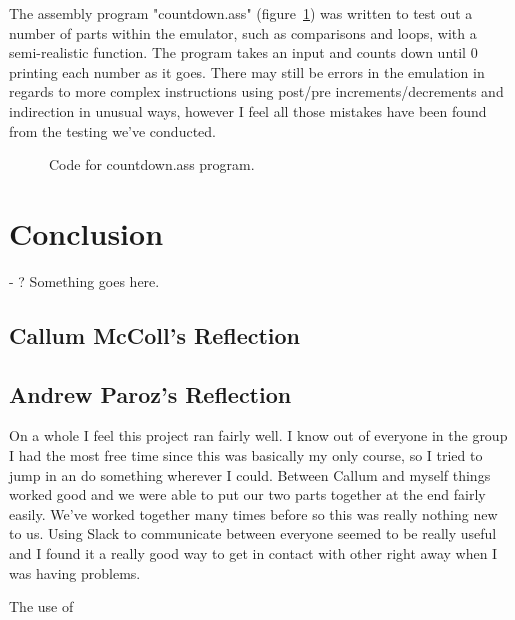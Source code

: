 \documentclass[10point]{article}
\begin{document}
The assembly program "countdown.ass" (figure~\ref{fig:CountdownCode}) was written to test out a number of parts within the emulator, such as comparisons and loops, with a semi-realistic function. The program takes an input and counts down until 0 printing each number as it goes. There may still be errors in the emulation in regards to more complex instructions using post/pre increments/decrements and indirection in unusual ways, however I feel all those mistakes have been found from the testing we've conducted.

\begin{figure}[h]
    \caption{Code for countdown.ass program.}
    \label{fig:CountdownCode}
\end{figure}

\section{Conclusion}
- ? Something goes here.

\subsection{Callum McColl's Reflection}

\subsection{Andrew Paroz's Reflection}
On a whole I feel this project ran fairly well. I know out of everyone in the group I had the most free time since this was basically my only course, so I tried to jump in an do something wherever I could. Between Callum and myself things worked good and we were able to put our two parts together at the end fairly easily. We've worked together many times before so this was really nothing new to us. Using Slack to communicate between everyone seemed to be really useful and I found it a really good way to get in contact with other right away when I was having problems.

The use of 
\end{document}
